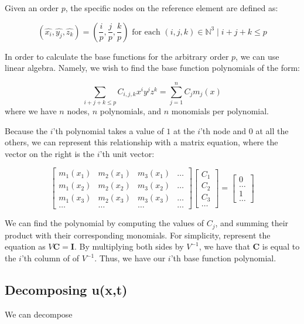 Given an order $p$, the specific nodes on the reference element are defined as:

$$(\hat{x_i}, \hat{y_j}, \hat{z_k}) = \left( \frac{i}{p}, \frac{j}{p}, \frac{k}{p} \right) \text{ for each } (i,j,k) \in \mathbb{N}^3 \mid i + j + k \leq p$$ 

In order to calculate the base functions for the arbitrary order $p$, we can use linear algebra. Namely, we wish to find the base function polynomials of the form:

$$\sum\limits_{i+j+k \leq p} C_{i,j,k} x^i y^j z^k = \sum\limits_{j=1}^n C_j m_j(x)$$
where we have $n$ nodes, $n$ polynomials, and $n$ monomials per polynomial. 

Because the $i$'th polynomial takes a value of $1$ at the $i$'th node and $0$ at all the others, we can represent this relationship with a matrix equation, where the vector on the right is the $i$'th unit vector:

$$\begin{bmatrix}
m_1(x_1) & m_2(x_1) & m_3(x_1) & \ldots \\
m_1(x_2) & m_2(x_2) & m_3(x_2) & \ldots \\
m_1(x_3) & m_2(x_3) & m_3(x_3) & \ldots \\
\ldots & \ldots & \ldots & \ldots 
\end{bmatrix} 
\begin{bmatrix}
C_1 \\
C_2 \\
C_3 \\
\ldots
\end{bmatrix}
= \begin{bmatrix}
0 \\
\ldots \\
1 \\
\ldots
\end{bmatrix} $$

We can find the polynomial by computing the values of $C_j$,
and summing their product with their corresponding monomials. For simplicity, represent the equation as $V \boldsymbol{C} = \boldsymbol{I}$. By multiplying both sides by $V^{-1}$, we have that $\boldsymbol{C}$ is equal to the $i$'th column of of $V^{-1}$. Thus, we have our $i$'th base function polynomial.

\subsection{Decomposing u(x,t)}

We can decompose 


